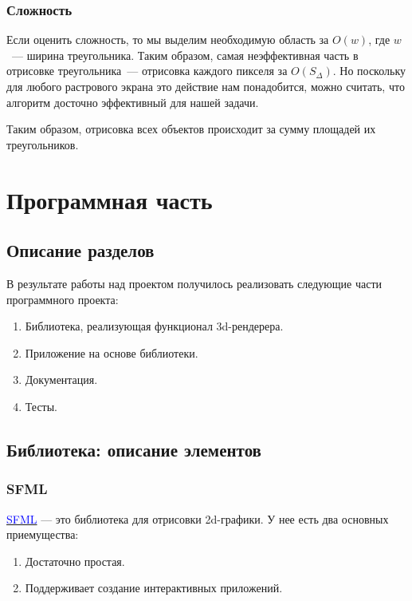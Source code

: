 \documentclass{article}
\begin{document}
\subsubsection{Сложность}

Если оценить сложность, то мы выделим необходимую область за $O(w)$, где $w$~--- ширина треугольника. Таким образом, самая неэффективная часть в отрисовке треугольника~--- отрисовка каждого пикселя за $O(S_{\Delta})$. Но поскольку для любого растрового экрана это действие нам понадобится, можно считать, что алгоритм досточно эффективный для нашей задачи.

Таким образом, отрисовка всех объектов происходит за сумму площадей их треугольников.

\newpage

\section{Программная часть}

\subsection{Описание разделов}

В результате работы над проектом получилось реализовать следующие части программного проекта:

\begin{enumerate}
\item Библиотека, реализующая функционал 3d-рендерера.
\item Приложение на основе библиотеки.
\item Документация.
\item Тесты.
\end{enumerate}

\subsection{Библиотека: описание элементов}

\subsubsection{SFML}

\href{https://www.sfml-dev.org/}{\textcolor{blue}{SFML}} --- это библиотека для отрисовки 2d-графики. У нее есть два основных приемущества:

\begin{enumerate}

\item Достаточно простая.
\item Поддерживает создание интерактивных приложений.

\end{enumerate}
\end{document}
